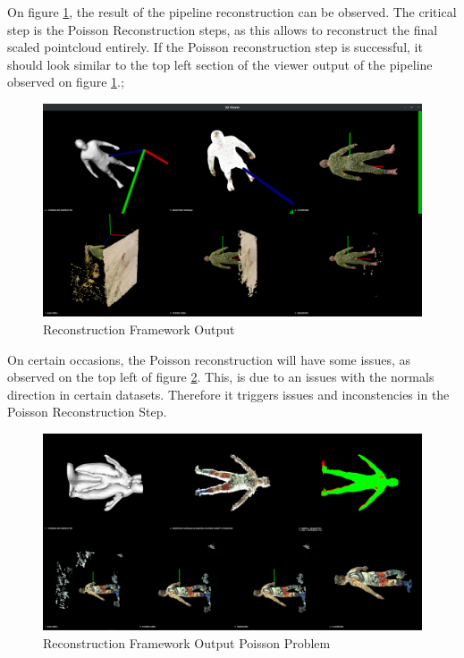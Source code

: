 \documentclass[12pt]{report}
\begin{document}
On figure \ref{fig:pcl_result1}, the result of the pipeline reconstruction can be observed. 
The critical step is the Poisson Reconstruction steps, as this allows to reconstruct the final scaled pointcloud entirely.
If the Poisson reconstruction step is successful, it should look similar to the top left section of the viewer output of the pipeline observed on figure \ref{fig:pcl_result1}.;

\begin{figure}[H]%
  \centering
 \includegraphics[width=1\textwidth]{3D Viewer_030.png}
\caption{Reconstruction Framework Output}
\label{fig:pcl_result1} 
\end{figure}

On certain occasions, the  Poisson reconstruction will have some issues, as observed on the top left of figure \ref{fig:pcl_result2}.
This, is due to an issues with the normals direction in certain datasets. Therefore it triggers issues and inconstencies in the Poisson Reconstruction Step.
\begin{figure}[H]%
  \centering
 \includegraphics[width=1\textwidth]{pipeline.png}
\caption{Reconstruction Framework Output Poisson Problem}
\label{fig:pcl_result2} 
\end{figure}
 
\end{document}
